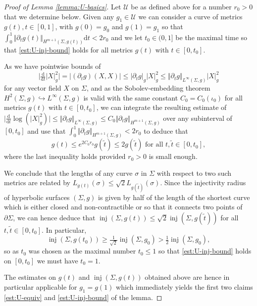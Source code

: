 \documentclass[10pt,reqno]{amsart}
\theoremstyle{plain}
\theoremstyle{definition}
\numberwithin{equation}{section}
\newcommand{\si}{\sigma}
\newcommand{\Si}{\Sigma}
\DeclareMathOperator{\inj}{inj}
\newcommand{\norm}[1]{\Vert#1\Vert}
\newcommand{\dd}{\mathrm{d}} %
\newcommand{\pt}{\partial_t}
\newcommand{\abs}[1]{\vert#1\vert}
\newcommand{\pSi}{{\partial \Sigma}}
\newcommand{\UU}{{\mathcal U}}
\begin{document}
\begin{proof}[Proof of Lemma \ref{lemma:U-basics}]
    Let $\UU$ be as defined above for a number $r_0>0$ that we determine below. Given any $g_1\in \UU$ we can consider a curve of metrics $g(t), t\in [0,1]$, with $g(0)=g_0$ and $g(1)=g_1$ so that $\int_0^1\norm{\pt g(t)}_{H^{m+1}(\Si,g(t))}\dd t<2r_0$ and we let $t_0\in (0,1]$ be the maximal time so that \eqref{est:U-inj-bound} holds for all metrics $g(t)$ with $t\in [0,t_0]$. 

    As we have pointwise bounds of 
    \begin{equation}
        \abs{\tfrac{\dd}{\dd t} \abs{X}_{g}^2}=\abs{(\pt g)(X,X)}\leq \abs{\pt g}_{g} \abs{X}_{g}^2\leq \norm{\pt g}_{L^\infty(\Si,g)} \abs{X}_{g}^2
    \end{equation}
    for any vector field $X$ on $\Si$, and as the Sobolev-embedding theorem $H^2(\Si,g)\hookrightarrow L^\infty(\Si,g)$ is valid with the same constant $C_0=C_0(\iota_0)$ for all metrics $g(t)$ with $t\in [0,t_0]$, we can integrate the resulting estimate of $\abs{\tfrac{\dd}{\dd t} \log(\abs{X}_{g}^2)}\leq  \norm{\pt g}_{L^\infty(\Si,g)}\leq C_0 \norm{\pt g}_{H^{m+1}(\Si,g)}$ over any subinterval of $[0,t_0]$ and use that $\int_0^1\norm{\pt g}_{H^{m+1}(\Si,g)}<2r_0$ to deduce that 
    \begin{equation}
        g(t)\leq e^{2C_0 r_0} g(\tilde t) \leq 2 g(\tilde t)\text{ for all }t,\tilde t\in [0,t_0],
    \end{equation}
    where the last inequality holds provided $r_0>0$ is small enough. 
    
    We conclude that the lengths of any curve $\si$ in $\Si$ with respect to two such metrics are related by $L_{g(t)}(\si)\leq \sqrt{2} L_{g(\tilde t)}(\si)$. Since the injectivity radius of hyperbolic surfaces $(\Si,g)$ is given by half of the length of the shortest curve which is either closed and non-contractible or so that it connects two points of $\pSi$, we can hence deduce that $\inj(\Si,g(t))\leq \sqrt{2} \inj(\Si,g(\tilde t))$ for all $t,\tilde t\in [0,t_0]$. In particular, 
    $$\inj(\Si,g(t_0))\geq \tfrac{1}{\sqrt 2} \inj(\Si,g_0) > \tfrac{1}{ 2} \inj(\Si,g_0),$$
    so as $t_0$ was chosen as the maximal number $t_0\leq 1$ so that \eqref{est:U-inj-bound} holds on $[0,t_0]$ we must have $t_0=1$. 
    
    The estimates on $g(t)$ and $\inj(\Si,g(t))$ obtained above are hence in particular applicable for $g_1=g(1)$ which immediately yields the first two claims \eqref{est:U-equiv} and \eqref{est:U-inj-bound} of the lemma. 
    

\end{proof}
\end{document}
